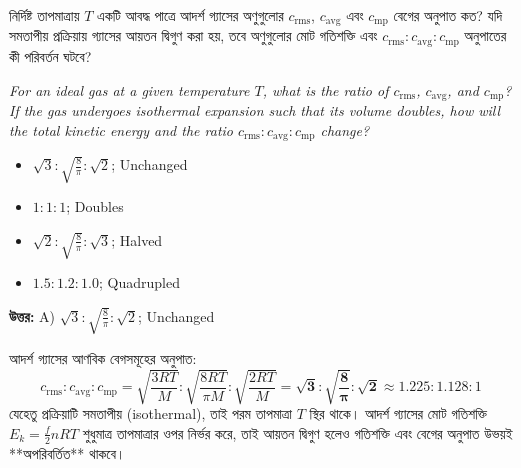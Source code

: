 \documentclass[12pt, a4paper]{article}
\begin{document}
\begin{tcolorbox}[questionbox={প্রশ্ন (Question) 14}]
    \noindent
    নির্দিষ্ট তাপমাত্রায় $T$ একটি আবদ্ধ পাত্রে আদর্শ গ্যাসের অণুগুলোর $c_{\text{rms}}$, $c_{\text{avg}}$ এবং $c_{\text{mp}}$ বেগের অনুপাত কত? যদি সমতাপীয় প্রক্রিয়ায় গ্যাসের আয়তন দ্বিগুণ করা হয়, তবে অণুগুলোর মোট গতিশক্তি এবং $c_{\text{rms}} : c_{\text{avg}} : c_{\text{mp}}$ অনুপাতের কী পরিবর্তন ঘটবে?
    
    \vspace{0.8em}
    \begin{english}
    \noindent\textit{\color{darkgray}
    For an ideal gas at a given temperature $T$, what is the ratio of $c_{\text{rms}}$, $c_{\text{avg}}$, and $c_{\text{mp}}$? If the gas undergoes isothermal expansion such that its volume doubles, how will the total kinetic energy and the ratio $c_{\text{rms}} : c_{\text{avg}} : c_{\text{mp}}$ change?
    }
    \end{english}
\end{tcolorbox}

\begin{itemize}[label={}, leftmargin=1cm, itemsep=0.5em]
    \item[\textbf{A)}] $\sqrt{3} : \sqrt{\frac{8}{\pi}} : \sqrt{2}$; Unchanged
    \item[\textbf{B)}] $1 : 1 : 1$; Doubles
    \item[\textbf{C)}] $\sqrt{2} : \sqrt{\frac{8}{\pi}} : \sqrt{3}$; Halved
    \item[\textbf{D)}] $1.5 : 1.2 : 1.0$; Quadrupled
\end{itemize}

\vspace{0.5em}
\begin{tcolorbox}[answerbox]
    \textbf{\color{success} উত্তর:} A) $\sqrt{3} : \sqrt{\frac{8}{\pi}} : \sqrt{2}$; Unchanged
\end{tcolorbox}
\vspace{1em}

\begin{tcolorbox}[solutionbox={সমাধান (Solution)}]
    \noindent
    আদর্শ গ্যাসের আণবিক বেগসমূহের অনুপাত:
    \[ c_{\text{rms}} : c_{\text{avg}} : c_{\text{mp}} = \sqrt{\frac{3RT}{M}} : \sqrt{\frac{8RT}{\pi M}} : \sqrt{\frac{2RT}{M}} = \mathbf{\sqrt{3} : \sqrt{\frac{8}{\pi}} : \sqrt{2}} \approx 1.225 : 1.128 : 1 \]
    যেহেতু প্রক্রিয়াটি সমতাপীয় (isothermal), তাই পরম তাপমাত্রা $T$ স্থির থাকে। আদর্শ গ্যাসের মোট গতিশক্তি $E_k = \frac{f}{2} n R T$ শুধুমাত্র তাপমাত্রার ওপর নির্ভর করে, তাই আয়তন দ্বিগুণ হলেও গতিশক্তি এবং বেগের অনুপাত উভয়ই **অপরিবর্তিত** থাকবে।
\end{tcolorbox}
\end{document}
